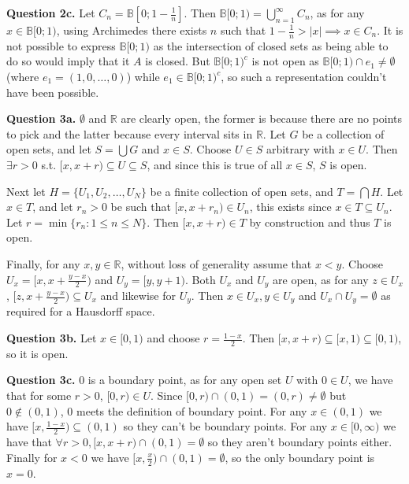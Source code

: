 \documentclass[letterpaper, reqno,11pt]{article}
\begin{document}
{\medskip\noindent\bf Question 2c.} Let $C_n=\mathbb B[0;1-\frac{1}{n}]$. Then $\mathbb B[0; 1)=\bigcup_{n=1}^{\infty}C_n$, as for any $x\in \mathbb B[0; 1)$, using Archimedes there exists $n$ such that $1-\frac{1}{n}>|x|\implies x\in C_n$. It is not possible to express $\mathbb B[0;1)$ as the intersection of closed sets as being able to do so would imply that it $A$ is closed. But $\mathbb B[0;1)^{c}$ is not open as $\mathbb B[0;1)\cap e_1\neq \emptyset$ (where $e_1=(1,0,\ldots,0)$) while $e_1\in \mathbb B[0;1)^{c}$, so such a representation couldn't have been possible.

\newpage\phantom{blabla}
\newpage

{\medskip\noindent\bf Question 3a.} $\emptyset$ and $\mathbb{R}$ are clearly open, the former is because there are no points to pick and the latter because every interval sits in $\mathbb{R}$. Let $G$ be a collection of open sets, and let $S=\bigcup G$ and $x\in S$. Choose $U\in S$ arbitrary with $x\in U$. Then $\exists r>0$ s.t. $[x,x+r)\subseteq U\subseteq S$, and since this is true of all $x\in S$, $S$ is open. 

Next let $H=\{U_1,U_2,\ldots,U_N\}$ be a finite collection of open sets, and $T=\bigcap H$. Let $x\in T$, and let $r_n>0$ be such that $[x,x+r_n)\in U_n$, this exists since $x\in T\subseteq U_n$. Let $r=\min \{r_n: 1\leq n\leq N\}$. Then $[x,x+r)\in T$ by construction and thus $T$ is open. 

Finally, for any $x,y\in \mathbb{R}$, without loss of generality assume that $x<y$. Choose $U_x=[x,x+\frac{y-x}{2})$ and $U_y=[y,y+1)$. Both $U_x$ and $U_y$ are open, as for any $z\in U_x$, $[z,x+\frac{y-x}{2})\subseteq U_x$ and likewise for $U_y$. Then $x\in U_x,y\in U_y$ and $U_x\cap U_y=\emptyset$ as required for a Hausdorff space.

{\medskip\noindent\bf Question 3b.} Let $x\in [0,1)$ and choose $r=\frac{1-x}{2}$. Then $[x,x+r)\subseteq [x,1)\subseteq [0,1)$, so it is open.

{\medskip\noindent\bf Question 3c.} $0$ is a boundary point, as for any open set $U$ with $0\in U$, we have that for some $r>0$, $[0,r)\in U$. Since $[0,r)\cap (0,1)=(0,r)\neq \emptyset$ but $0\notin (0,1)$, $0$ meets the definition of boundary point. For any $x\in (0,1)$ we have $[x,\frac{1-x}{2})\subseteq (0,1)$ so they can't be boundary points. For any $x\in [0,\infty)$ we have that $\forall r>0,[x,x+r)\cap (0,1)=\emptyset$ so they aren't boundary points either. Finally for $x<0$ we have $[x,\frac{x}{2})\cap (0,1)= \emptyset$, so the only boundary point is $x=0$.
\end{document}
